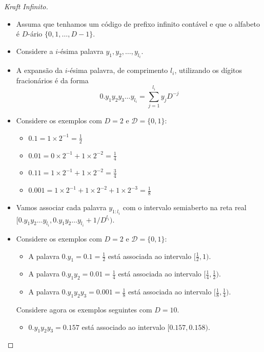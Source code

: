 \begin{frame}[allowframebreaks]
  \begin{proof}[Kraft Infinito]
  \begin{itemize}
  \item Assuma que tenhamos um código de prefixo infinito contável e que o alfabeto é $D$-ário $\{0,1,\ldots,D-1\}$.
  \item Considere a $i$-ésima palavra $y_1,y_2,\ldots,y_{l_i}$.
  \item A expansão da $i$-ésima palavra, de comprimento $l_i$, utilizando os dígitos fracionários é da forma
	\begin{equation}
	0.y_1 y_2 y_3 \ldots y_{l_i} = \sum_{j=1}^{l_i} y_j D^{-j}
	\end{equation}
  \end{itemize}
  \proofbreak
  \begin{itemize}
  \item Considere os exemplos com $D=2$ e $\mathcal{D} = \{0,1\}$:
  	\begin{itemize}
	\item $0.1 = 1 \times 2^{-1} = \frac{1}{2}$
 	\item $0.01 = 0 \times 2^{-1} + 1 \times 2^{-2} = \frac{1}{4}$
	\item $0.11 = 1 \times 2^{-1} + 1 \times 2^{-2} = \frac{3}{4}$
	\item $0.001 = 1 \times 2^{-1} + 1 \times 2^{-2} + 1 \times 2^{-3} = \frac{1}{8}$
	\end{itemize}
  \item Vamos associar cada palavra $y_{1:l_i}$ com o intervalo semiaberto na reta real
	$[0.y_1 y_2 \ldots y_{l_i} , 0.y_1 y_2 \ldots y_{l_i} + 1/D^{l_i} )$.
  \end{itemize}
  \proofbreak
  \begin{itemize}
  \item Considere os exemplos com $D=2$ e $\mathcal{D} = \{0,1\}$:
	\begin{itemize}
        \item A palavra $0.y_1 = 0.1 = \frac{1}{2}$ está associada ao intervalo $[\frac{1}{2}, 1)$.
	\item A palavra $0.y_1 y_2 = 0.01 = \frac{1}{4}$ está associada ao intervalo $[\frac{1}{4}, \frac{1}{2})$.
	\item A palavra $0.y_1 y_2 y_3= 0.001 = \frac{1}{8}$ está associada ao intervalo $[\frac{1}{8}, \frac{1}{4})$.
        \end{itemize}
	Considere agora os exemplos seguintes com $D=10$.
	\begin{itemize}
        \item $0.y_1 y_2 y_3 = 0.157$ está associado ao intervalo $[0.157, 0.158)$.

\end{itemize}
\end{itemize}
\end{proof}
\end{frame}
